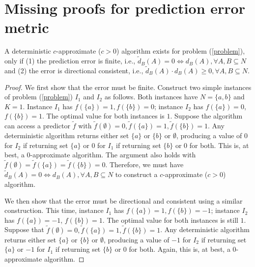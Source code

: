 
\clearpage  
\onecolumn  

\section{Missing proofs for prediction error metric} 

\begin{lemma} 
A deterministic $c$-approximate ($c > 0$) algorithm exists for problem (\ref{problem}), only if (1) the prediction error is finite, i.e., $\tilde{d}_B(A) = 0 \iff {d}_B(A), \forall A, B \subseteq N$ and (2) the error is directional consistent, i.e., $\tilde{d}_B(A) \cdot {d}_B(A) \geq 0, \forall A, B \subseteq N$.
\end{lemma} 
\begin{proof}
We first show that the error must be finite. Construct two simple instances of problem (\ref{problem}) $I_1$ and $I_2$ as follows. Both instances have $N = \{ a, b \}$ and $K = 1$. Instance $I_1$ has $f(\{a\}) = 1, f(\{b\}) = 0$; instance $I_2$ has $f(\{ a \}) = 0$, $f(\{ b \}) = 1$. The optimal value for both instances is $1$. Suppose the algorithm can access a predictor $\tilde{f}$ with $\tilde{f}(\emptyset) = 0, \tilde{f}(\{a\}) = 1, \tilde{f}(\{b\}) = 1$. Any deterministic algorithm returns either set $\{ a \}$ or $\{ b \}$ or $\emptyset$, producing a value of $0$ for $I_2$ if returning set $\{ a \}$ or $0$ for $I_1$ if returning set $\{ b \}$ or $0$ for both. This is, at best, a $0$-approximate algorithm. The argument also holds with $\tilde{f}(\emptyset) = \tilde{f}(\{a\}) = \tilde{f}(\{b\}) = 0$. Therefore, we must have $\tilde{d}_B(A) = 0 \iff {d}_B(A), \forall A, B \subseteq N$ to construct a $c$-approximate ($c > 0$) algorithm. 

We then show that the error must be directional and consistent using a similar construction. This time, instance $I_1$ has $f(\{a\}) = 1, f(\{b\}) = -1$; instance $I_2$ has $f(\{ a \}) = -1$, $f(\{ b \}) = 1$. The optimal value for both instances is still $1$. Suppose that $\tilde{f}(\emptyset) = 0, \tilde{f}(\{a\}) = 1, \tilde{f}(\{b\}) = 1$. Any deterministic algorithm returns either set $\{ a \}$ or $\{ b \}$ or $\emptyset$, producing a value of $-1$ for $I_2$ if returning set $\{ a \}$ or $-1$ for $I_1$ if returning set $\{ b \}$ or $0$ for both. Again, this is, at best, a $0$-approximate algorithm. 
\end{proof}

